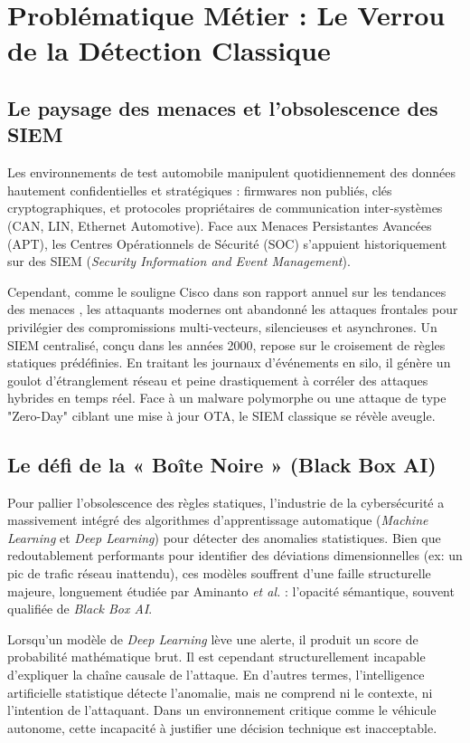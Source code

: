 \documentclass[a4paper, 12pt]{report}
\begin{document}
\section{Problématique Métier : Le Verrou de la Détection Classique}
\label{sec:problematique_metier}

\subsection{Le paysage des menaces et l'obsolescence des SIEM}
Les environnements de test automobile manipulent quotidiennement des données hautement confidentielles et stratégiques : firmwares non publiés, clés cryptographiques, et protocoles propriétaires de communication inter-systèmes (CAN, LIN, Ethernet Automotive). Face aux Menaces Persistantes Avancées (APT), les Centres Opérationnels de Sécurité (SOC) s'appuient historiquement sur des SIEM (\textit{Security Information and Event Management}). 

Cependant, comme le souligne Cisco dans son rapport annuel sur les tendances des menaces \cite{cisco_trends}, les attaquants modernes ont abandonné les attaques frontales pour privilégier des compromissions multi-vecteurs, silencieuses et asynchrones. Un SIEM centralisé, conçu dans les années 2000, repose sur le croisement de règles statiques prédéfinies. En traitant les journaux d'événements en silo, il génère un goulot d'étranglement réseau et peine drastiquement à corréler des attaques hybrides en temps réel. Face à un malware polymorphe ou une attaque de type "Zero-Day" ciblant une mise à jour OTA, le SIEM classique se révèle aveugle.

\subsection{Le défi de la « Boîte Noire » (Black Box AI)}
Pour pallier l'obsolescence des règles statiques, l'industrie de la cybersécurité a massivement intégré des algorithmes d'apprentissage automatique (\textit{Machine Learning} et \textit{Deep Learning}) pour détecter des anomalies statistiques. Bien que redoutablement performants pour identifier des déviations dimensionnelles (ex: un pic de trafic réseau inattendu), ces modèles souffrent d'une faille structurelle majeure, longuement étudiée par Aminanto \textit{et al.} \cite{aminanto_xai} : l'opacité sémantique, souvent qualifiée de \textit{Black Box AI}. 

Lorsqu'un modèle de \textit{Deep Learning} lève une alerte, il produit un score de probabilité mathématique brut. Il est cependant structurellement incapable d'expliquer la chaîne causale de l'attaque. En d'autres termes, l'intelligence artificielle statistique détecte l'anomalie, mais ne comprend ni le contexte, ni l'intention de l'attaquant. Dans un environnement critique comme le véhicule autonome, cette incapacité à justifier une décision technique est inacceptable.
\end{document}
